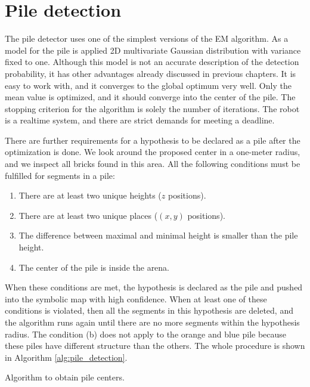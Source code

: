 \section{Pile detection}
\label{sec:pile_detector}
The pile detector uses one of the simplest versions of the EM algorithm. As a model for the pile is applied 2D multivariate Gaussian distribution with variance fixed to one. Although this model is not an accurate description of the detection probability, it has other advantages already discussed in previous chapters. It is easy to work with, and it converges to the global optimum very well. Only the mean value is optimized, and it should converge into the center of the pile. The stopping criterion for the algorithm is solely the number of iterations. The robot is a realtime system, and there are strict demands for meeting a deadline. 

There are further requirements for a hypothesis to be declared as a pile after the optimization is done. We look around the proposed center in a one-meter radius, and we inspect all bricks found in this area. All the following conditions must be fulfilled for segments in a pile:
\begin{enumerate}[label=(\alph*)]
\item There are at least two unique heights ($z$ positions).
\item There are at least two unique places ($(x,y)$ positions).
\item The difference between maximal and minimal height is smaller than the pile height.
\item The center of the pile is inside the arena.
\end{enumerate}
When these conditions are met, the hypothesis is declared as the pile and pushed into the symbolic map with high confidence. When at least one of these conditions is violated, then all the segments in this hypothesis are deleted, and the algorithm runs again until there are no more segments within the hypothesis radius. The condition (b) does not apply to the orange and blue pile because these piles have different structure than the others. The whole procedure is shown in Algorithm \ref{alg:pile_detection}.
\begin{algorithm}[]
 \caption{Algorithm to obtain pile centers.}
 \label{alg:pile_detection}
\end{algorithm}


